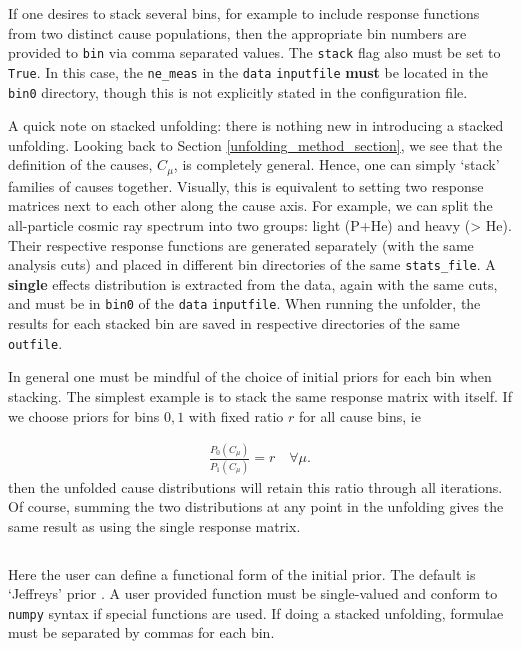 If one desires to stack several bins, for example to include response functions from two distinct cause populations,
then the appropriate bin numbers are provided to \verb|bin| via comma separated values. The \verb|stack| flag also must be set to \verb|True|.
In this case, the \verb|ne_meas| in the \verb|data| \verb|inputfile| {\bf must} be located in the \verb|bin0| directory, though this is not explicitly
stated in the configuration file.

A quick note on stacked unfolding: there is nothing new in introducing a stacked unfolding. Looking back to Section \ref{unfolding_method_section},
we see that the definition of the causes, $C_{\mu}$, is completely general. Hence, one can simply `stack' families of causes together.
Visually, this is equivalent to setting two response matrices next to each other along the cause axis.
For example, we can split the all-particle cosmic ray spectrum into two groups: light (P+He) and heavy (> He). 
Their respective response functions are generated separately (with the same analysis cuts) and placed in different bin directories of the same \verb|stats_file|.
A {\bf single} effects distribution is extracted from the data, again with the same cuts, and must be in \verb|bin0| of the \verb|data| \verb|inputfile|.
When running the unfolder, the results for each stacked bin are saved in respective directories of the same \verb|outfile|.

In general one must be mindful of the choice of initial priors for each bin when stacking. The simplest example is to stack the same response matrix with itself.
If we choose priors for bins $0,1$ with fixed ratio $r$ for all cause bins, ie

\begin{equation} \label{eq:equalstackedpriors}
 \begin{split}
    \frac{P_{0}(C_{\mu})}{P_{1}(C_{\mu})} = r \quad \forall \mu.
 \end{split}
\end{equation}
then the unfolded cause distributions will retain this ratio through all iterations. 
Of course, summing the two distributions at any point in the unfolding gives the same result as using the single response matrix.


\noindent\hrulefill

\inputminted[firstline=24,lastline=27]{ini}{config_example.cfg}
Here the user can define a functional form of the initial prior.
The default is `Jeffreys' prior \cite{jeffreys}.
A user provided function must be single-valued and conform to \verb|numpy| syntax if special functions are used.
If doing a stacked unfolding, formulae must be separated by commas for each bin.


